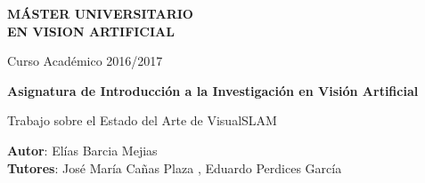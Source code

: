 \thispagestyle{empty}
\vspace{5cm}


\begin{center}
  {\large {\bf MÁSTER UNIVERSITARIO\\ EN VISION ARTIFICIAL}}
  \vspace{5mm}
 
  {\large {Curso Académico 2016/2017}}

  \vspace{2cm}

  {\large {\bf  Asignatura de Introducción a la Investigación en Visión Artificial}}

  \vspace{3cm}

  {\Large {{\Huge {Trabajo sobre el Estado del Arte de VisualSLAM }} \\[1cm] }}




  \vspace{5cm}
  {\bf Autor}: Elías Barcia Mejias\\
  {\bf Tutores}: José María Cañas Plaza , Eduardo Perdices García
\end{center}
